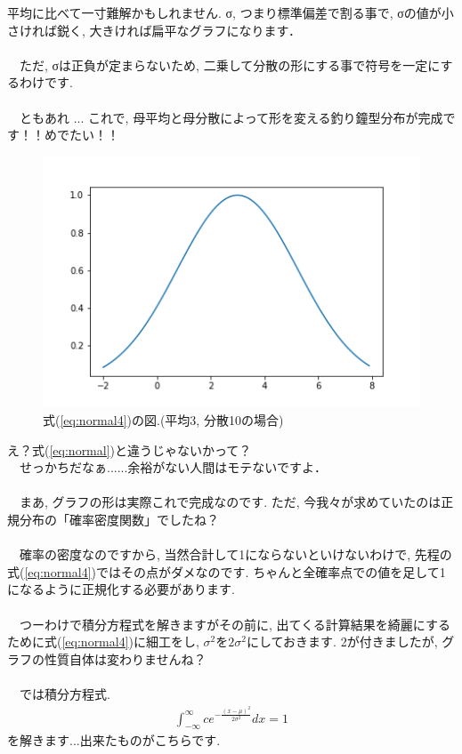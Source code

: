 \documentclass[11pt,a4paper]{jsarticle}                    %
\begin{document}
平均に比べて一寸難解かもしれません. σ, つまり標準偏差で割る事で, σの値が小さければ鋭く, 大きければ扁平なグラフになります．\\
\\
　ただ, σは正負が定まらないため, 二乗して分散の形にする事で符号を一定にするわけです. \\
\\
　ともあれ ... これで, 母平均と母分散によって形を変える釣り鐘型分布が完成です！！めでたい！！\\

\begin{figure}[H]
\label{im:normal}
  \centering
  \includegraphics[width=120mm,bb=0 0 432 288]{../figures/normal4.png}
  \caption{式(\ref{eq:normal4})の図.(平均3, 分散10の場合)}
\end{figure}

え？式(\ref{eq:normal})と違うじゃないかって？\\
　せっかちだなぁ......余裕がない人間はモテないですよ．\\
\\
　まあ, グラフの形は実際これで完成なのです. ただ, 今我々が求めていたのは正規分布の「確率密度関数」でしたね？\\
\\
　確率の密度なのですから, 当然合計して1にならないといけないわけで, 先程の式(\ref{eq:normal4})ではその点がダメなのです. ちゃんと全確率点での値を足して1になるように正規化する必要があります.\\
\\
　つーわけで積分方程式を解きますがその前に, 出てくる計算結果を綺麗にするために式(\ref{eq:normal4})に細工をし, $\sigma^2$を$2\sigma^2$にしておきます. 2が付きましたが, グラフの性質自体は変わりませんね？\\
\\
　では積分方程式.
\begin{eqnarray}
\int_{-\infty}^{\infty} c e^{-\frac{(x-\mu)^2}{2\sigma^2}} dx= 1
\end{eqnarray}
を解きます...出来たものがこちらです.
\end{document}
